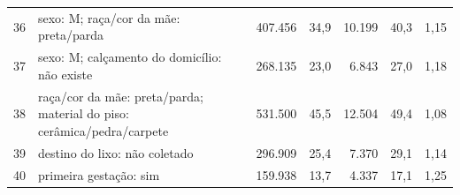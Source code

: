 \begin{table}[H]
\begin{tabularx}{\textwidth}{@{}c Y r r r r r@{}}
36 & sexo: M; raça/cor da mãe: preta/parda & 407.456 & 34,9 & 10.199 & 40,3 & 1,15 \\
37 & sexo: M; calçamento do domicílio: não existe & 268.135 & 23,0 & 6.843 & 27,0 & 1,18 \\
38 & raça/cor da mãe: preta/parda; material do piso: cerâmica/pedra/carpete & 531.500 & 45,5 & 12.504 & 49,4 & 1,08 \\
39 & destino do lixo: não coletado & 296.909 & 25,4 & 7.370 & 29,1 & 1,14 \\
40 & primeira gestação: sim & 159.938 & 13,7 & 4.337 & 17,1 & 1,25 \\
\bottomrule
\end{tabularx}
\end{table}







